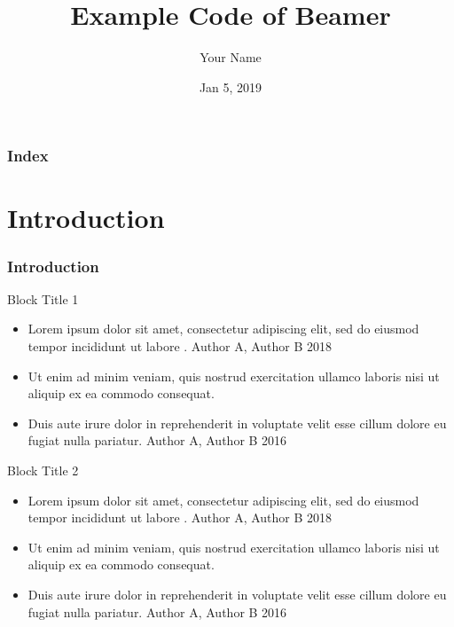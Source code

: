 \documentclass[9pt, dvipsnames]{beamer} %
\title{Example Code of Beamer} %
\author[Your Name]{Your Name} %
\date{Jan 5, 2019} %
\begin{document}
    \everymath{\displaystyle}

    \begin{frame}
        \titlepage %
    \end{frame}

    \begin{frame}
        \frametitle{\textbf{Index}}
        \tableofcontents %
    \end{frame}

    \section{Introduction}\label{sec:introduction}
    \begin{frame}
        \frametitle{\textbf{Introduction}}
        \begin{block}{Block Title 1}
            \begin{itemize}
                \item Lorem ipsum dolor sit amet, consectetur adipiscing elit, sed do eiusmod tempor incididunt ut labore . {\scriptsize \color{red} Author A, Author B 2018 }
                \item Ut enim ad minim veniam, quis nostrud exercitation ullamco laboris nisi ut aliquip ex ea commodo consequat.
                \item Duis aute irure dolor in reprehenderit in voluptate velit esse cillum dolore eu fugiat nulla pariatur.  {\scriptsize \color{red} Author A, Author B 2016 }
            \end{itemize}
        \end{block}
        \begin{exampleblock}{Block Title 2}
            \begin{itemize}
                \item Lorem ipsum dolor sit amet, consectetur adipiscing elit, sed do eiusmod tempor incididunt ut labore . {\scriptsize \color{red} Author A, Author B 2018 }
                \item Ut enim ad minim veniam, quis nostrud exercitation ullamco laboris nisi ut aliquip ex ea commodo consequat.
                \item Duis aute irure dolor in reprehenderit in voluptate velit esse cillum dolore eu fugiat nulla pariatur.  {\scriptsize \color{red} Author A, Author B 2016 }
            \end{itemize}
        \end{exampleblock}
    \end{frame}
\end{document}
